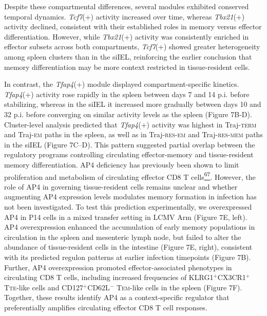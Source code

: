 Despite these compartmental differences, several modules exhibited
conserved temporal dynamics. \emph{Tcf7}(+) activity increased over
time, whereas \emph{Tbx21}(+) activity declined, consistent with their
established roles in memory versus effector differentiation. However,
while \emph{Tbx21}(+) activity was consistently enriched in effector
subsets across both compartments, \emph{Tcf7}(+) showed greater
heterogeneity among spleen clusters than in the siIEL, reinforcing the
earlier conclusion that memory differentiation may be more context
restricted in tissue-resident cells.

In contrast, the \emph{Tfap4}(+) module displayed compartment-specific
kinetics. \emph{Tfap4}(+) activity rose rapidly in the spleen between
days 7 and 14 p.i. before stabilizing, whereas in the siIEL it increased
more gradually between days 10 and 32 p.i. before converging on similar
activity levels as the spleen (Figure 7B-D). Cluster-level analysis
predicted that \emph{Tfap4}(+) activity was highest in
Traj-\textsc{term} and Traj-\textsc{em} paths in the spleen, as well as
in Traj-\textsc{res-em} and Traj-\textsc{res-mem} paths in the siIEL
(Figure 7C--D). This pattern suggested partial overlap between the
regulatory programs controlling circulating effector-memory and
tissue-resident memory differentiation. AP4 deficiency has previously
been shown to limit proliferation and metabolism of circulating effector
CD8 T
cells\href{https://sciwheel.com/work/citation?ids=5308382\&pre=\&suf=\&sa=0\&dbf=0}{\textsuperscript{67}}.
However, the role of AP4 in governing tissue-resident cells remains
unclear and whether augmenting AP4 expression levels modulates memory
formation in infection has not been investigated. To test this
prediction experimentally, we overexpressed AP4 in P14 cells in a mixed
transfer setting in LCMV Arm (Figure 7E, left). AP4 overexpression
enhanced the accumulation of early memory populations in circulation in
the spleen and mesenteric lymph node, but failed to alter the abundance
of tissue-resident cells in the intestine (Figure 7E, right), consistent
with its predicted regulon patterns at earlier infection timepoints
(Figure 7B). Further, AP4 overexpression promoted effector-associated
phenotypes in circulating CD8 T cells, including increased frequencies
of KLRG1$^{+}$CX3CR1$^{+}$ T\textsc{te-}like cells and CD127$^{+}$CD62L$^{-}$
T\textsc{em}-like cells in the spleen (Figure 7F). Together, these
results identify AP4 as a context-specific regulator that preferentially
amplifies circulating effector CD8 T cell responses.

